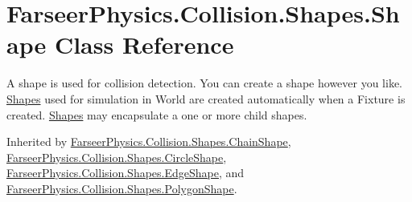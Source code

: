 \hypertarget{class_farseer_physics_1_1_collision_1_1_shapes_1_1_shape}{\section{Farseer\+Physics.\+Collision.\+Shapes.\+Shape Class Reference}
\label{class_farseer_physics_1_1_collision_1_1_shapes_1_1_shape}
}


A shape is used for collision detection. You can create a shape however you like. \hyperlink{namespace_farseer_physics_1_1_collision_1_1_shapes}{Shapes} used for simulation in World are created automatically when a Fixture is created. \hyperlink{namespace_farseer_physics_1_1_collision_1_1_shapes}{Shapes} may encapsulate a one or more child shapes.  




Inherited by \hyperlink{class_farseer_physics_1_1_collision_1_1_shapes_1_1_chain_shape}{Farseer\+Physics.\+Collision.\+Shapes.\+Chain\+Shape}, \hyperlink{class_farseer_physics_1_1_collision_1_1_shapes_1_1_circle_shape}{Farseer\+Physics.\+Collision.\+Shapes.\+Circle\+Shape}, \hyperlink{class_farseer_physics_1_1_collision_1_1_shapes_1_1_edge_shape}{Farseer\+Physics.\+Collision.\+Shapes.\+Edge\+Shape}, and \hyperlink{class_farseer_physics_1_1_collision_1_1_shapes_1_1_polygon_shape}{Farseer\+Physics.\+Collision.\+Shapes.\+Polygon\+Shape}.

